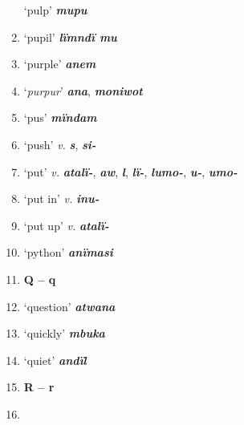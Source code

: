 \begin{enumerate}[noitemsep, label={}, align=left, widest=190, labelsep=1ex,leftmargin=*,itemindent=-10pt]
‘pulp’ \textbf{\textit{mupu}} \item
‘pupil’ \textbf{\textit{lïmndï mu}} \item
‘purple’ \textbf{\textit{anem}} \item
‘\textit{purpur}’ \textbf{\textit{ana}}, \textbf{\textit{moniwot}} \item
‘pus’ \textbf{\textit{mïndam}} \item
‘push’ \textit{v.} \textbf{\textit{s}}, \textbf{\textit{si-}} \item
‘put’ \textit{v.} \textbf{\textit{atalï-}}, \textbf{\textit{aw}}, \textbf{\textit{l}}, \textbf{\textit{lï-}}, \textbf{\textit{lumo-}}, \textbf{\textit{u-}}, \textbf{\textit{umo-}} \item
‘put in’ \textit{v.} \textbf{\textit{inu-}} \item
‘put up’ \textit{v.} \textbf{\textit{atalï-}} \item
‘python’ \textbf{\textit{anïmasi}}\\ \item

\noindent \textbf{Q – q}\\ \item

‘question’ \textbf{\textit{atwana}} \item
‘quickly’ \textbf{\textit{mbuka}} \item
‘quiet’ \textbf{\textit{andïl}}\\ \item

\noindent \textbf{R – r}\\ \item


\end{enumerate}
